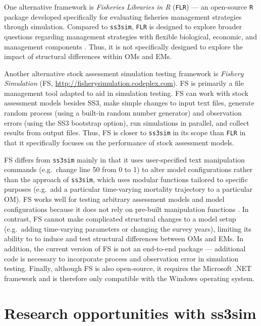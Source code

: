 \documentclass[12pt]{article}
\begin{document}
One alternative framework is \emph{Fisheries Libraries in R} (\texttt{FLR}) \cite{kell2007} --- an open-source \texttt{R} package developed specifically for evaluating fisheries management strategies through simulation. Compared to \texttt{ss3sim}, \texttt{FLR} is designed to explore broader questions regarding management strategies with flexible biological, economic, and management components \cite{hillary2009}. Thus, it is not specifically designed to explore the impact of structural differences within OMs and EMs.

Another alternative stock assessment simulation testing framework is \emph{Fishery Simulation} (FS, \url{http://fisherysimulation.codeplex.com}). FS is primarily a file management tool adapted to aid in simulation testing. FS can work with stock assessment models besides SS3, make simple changes to input text files, generate random process (using a built-in random number generator) and observation errors (using the SS3 bootstrap option), run simulations in parallel, and collect results from output files. Thus, FS is closer to \texttt{ss3sim} in its scope than \texttt{FLR} in that it specifically focuses on the performance of stock assessment models.

FS differs from \texttt{ss3sim} mainly in that it uses user-specified text manipulation commands (e.g.~change line 50 from 0 to 1) to alter model configurations rather than the approach of \texttt{ss3sim}, which uses modular functions tailored to specific purposes (e.g.~add a particular time-varying mortality trajectory to a particular OM). FS works well for testing arbitrary assessment models and model configurations because it does not rely on pre-built manipulation functions \cite{lee2012, piner2011, lee2011}. In contrast, FS cannot make complicated structural changes to a model setup (e.g.~adding time-varying parameters or changing the survey years), limiting its ability to to induce and test structural differences between OMs and EMs. In addition, the current version of FS is not an end-to-end package --- additional code is necessary to incorporate process and observation error in simulation testing. Finally, although FS is also open-source, it requires the Microsoft .NET framework and is therefore only compatible with the Windows operating system.

\section*{Research opportunities with ss3sim}
\end{document}
